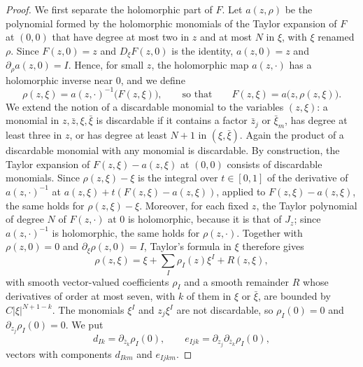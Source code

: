 \begin{proof}
We first separate the holomorphic part of $F$. Let $a(z,\rho)$ be the polynomial formed by the holomorphic monomials of the Taylor expansion of $F$ at $(0,0)$ that have degree at most two in $z$ and at most $N$ in $\xi$, with $\xi$ renamed $\rho$. Since $F(z,0)=z$ and $D_\xi F(z,0)$ is the identity, $a(z,0)=z$ and $\partial_\rho a(z,0)=I$. Hence, for small $z$, the holomorphic map $a(z,\cdot)$ has a holomorphic inverse near $0$, and we define
\[
 \rho(z,\xi)=a(z,\cdot)^{-1}\bigl(F(z,\xi)\bigr),\qquad\text{so that}\qquad F(z,\xi)=a\bigl(z,\rho(z,\xi)\bigr).
\]
We extend the notion of a discardable monomial to the variables $(z,\xi)$: a monomial in $z,\bar z,\xi,\bar\xi$ is discardable if it contains a factor $\bar z_j$ or $\bar\xi_m$, has degree at least three in $z$, or has degree at least $N+1$ in $(\xi,\bar\xi)$. Again the product of a discardable monomial with any monomial is discardable. By construction, the Taylor expansion of $F(z,\xi)-a(z,\xi)$ at $(0,0)$ consists of discardable monomials. Since $\rho(z,\xi)-\xi$ is the integral over $t\in[0,1]$ of the derivative of $a(z,\cdot)^{-1}$ at $a(z,\xi)+t(F(z,\xi)-a(z,\xi))$, applied to $F(z,\xi)-a(z,\xi)$, the same holds for $\rho(z,\xi)-\xi$. Moreover, for each fixed $z$, the Taylor polynomial of degree $N$ of $F(z,\cdot)$ at $0$ is holomorphic, because it is that of $J_z$; since $a(z,\cdot)^{-1}$ is holomorphic, the same holds for $\rho(z,\cdot)$. Together with $\rho(z,0)=0$ and $\partial_\xi\rho(z,0)=I$, Taylor's formula in $\xi$ therefore gives
\begin{equation}\label{eq:chern-fiber-factorization}
 \rho(z,\xi)=\xi+\sum_I\rho_I(z)\xi^I+R(z,\xi),
\end{equation}
with smooth vector-valued coefficients $\rho_I$ and a smooth remainder $R$ whose derivatives of order at most seven, with $k$ of them in $\xi$ or $\bar\xi$, are bounded by $C|\xi|^{N+1-k}$. The monomials $\xi^I$ and $z_j\xi^I$ are not discardable, so $\rho_I(0)=0$ and $\partial_{z_j}\rho_I(0)=0$. We put
\[
 d_{Ik}=\partial_{\bar z_k}\rho_I(0),\qquad e_{Ijk}=\partial_{z_j}\partial_{\bar z_k}\rho_I(0),
\]
vectors with components $d_{Ikm}$ and $e_{Ijkm}$.


\end{proof}
